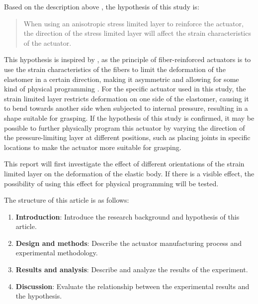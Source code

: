 \documentclass[conference]{IEEEtran}
\begin{document}
Based on the description above , the hypothesis of this study is:
\begin{quote}
When using an anisotropic stress limited layer to reinforce the actuator, the direction of the stress limited layer will affect the strain characteristics of the actuator.
\end{quote}


This hypothesis is inspired by \cite{mechanical_programing}, as the principle of fiber-reinforced actuators is to use the strain characteristics of the fibers to limit the deformation of the elastomer in a certain direction, making it asymmetric and allowing for some kind of physical programming \cite{fingerlike}. For the specific actuator used in this study, the strain limited layer restricts deformation on one side of the elastomer, causing it to bend towards another side when subjected to internal pressure, resulting in a shape suitable for grasping. If the hypothesis of this study is confirmed, it may be possible to further physically program this actuator by varying the direction of the pressure-limiting layer at different positions, such as placing joints in specific locations to make the actuator more suitable for grasping.


This report will first investigate the effect of different orientations of the strain limited layer on the deformation of the elastic body. If there is a visible effect, the possibility of using this effect for physical programming will be tested.


The structure of this article is as follows:
\begin{enumerate}
    \item \textbf{Introduction}: Introduce the research background and hypothesis of this article.
    \item \textbf{Design and methods}: Describe the actuator manufacturing process and experimental methodology.
    \item \textbf{Results and analysis}: Describe and analyze the results of the experiment.
    \item \textbf{Discussion}: Evaluate the relationship between the experimental results and the hypothesis.
\end{enumerate}
\end{document}

